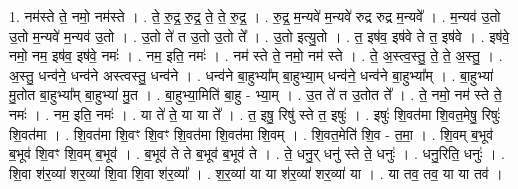\documentclass[17pt]{extarticle}
\begin{document}
1. नम॑स्ते ते॒ नमो॒ नम॑स्ते । . ते॒ रु॒द्र॒ रु॒द्र॒ ते॒ ते॒ रु॒द्र॒ । . रु॒द्र॒ म॒न्यवे॑ म॒न्यवे॑ रुद्र रुद्र म॒न्यवे᳚ । . म॒न्यव॑ उ॒तो उ॒तो म॒न्यवे॑ म॒न्यव॑ उ॒तो । . उ॒तो ते॑ त उ॒तो उ॒तो ते᳚ । . उ॒तो इत्यु॒तो । . त॒ इष॑व॒ इष॑वे ते त॒ इष॑वे । . इष॑वे॒ नमो॒ नम॒ इष॑व॒ इष॑वे॒ नमः॑ । . नम॒ इति॒ नमः॑ । . नम॑ स्ते ते॒ नमो॒ नम॑ स्ते । . ते॒ अ॒स्त्व॒स्तु॒ ते॒ ते॒ अ॒स्तु॒ । . अ॒स्तु॒ धन्व॑ने॒ धन्व॑ने अस्त्वस्तु॒ धन्व॑ने । . धन्व॑ने बा॒हुभ्या᳚म् बा॒हुभ्या॒म् धन्व॑ने॒ धन्व॑ने बा॒हुभ्या᳚म् । . बा॒हुभ्या॑ मु॒तोत बा॒हुभ्या᳚म् बा॒हुभ्या॑ मु॒त । . बा॒हुभ्या॒मिति॑ बा॒हु - भ्या॒म् । . उ॒त ते॑ त उ॒तोत ते᳚ । . ते॒ नमो॒ नम॑ स्ते ते॒ नमः॑ । . नम॒ इति॒ नमः॑ । . या ते॑ ते॒ या या ते᳚ । . त॒ इषु॒ रिषु॑ स्ते त॒ इषुः॑ । . इषुः॑ शि॒वत॑मा शि॒वत॒मेषु॒ रिषुः॑ शि॒वत॑मा । . शि॒वत॑मा शि॒वꣳ शि॒वꣳ शि॒वत॑मा शि॒वत॑मा शि॒वम् । . शि॒वत॒मेति॑ शि॒व - त॒मा॒ । . शि॒वम् ब॒भूव॑ ब॒भूव॑ शि॒वꣳ शि॒वम् ब॒भूव॑ । . ब॒भूव॑ ते ते ब॒भूव॑ ब॒भूव॑ ते । . ते॒ धनु॒र् धनु॑ स्ते ते॒ धनुः॑ । . धनु॒रिति॒ धनुः॑ । . शि॒वा श॑र॒व्या॑ शर॒व्या॑ शि॒वा शि॒वा श॑र॒व्या᳚ । . श॒र॒व्या॑ या या श॑र॒व्या॑ शर॒व्या॑ या । . या तव॒ तव॒ या या तव॑ । \newline
\end{document}
